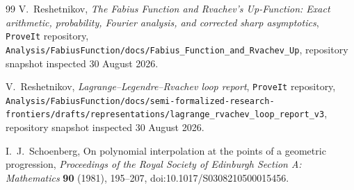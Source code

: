 \documentclass[11pt,a4paper,oneside]{article}
\theoremstyle{definition}
\theoremstyle{remark}
\begin{document}
\begin{thebibliography}{99}
V.~Reshetnikov,
\newblock \emph{The Fabius Function and Rvachev's Up-Function: Exact
arithmetic, probability, Fourier analysis, and corrected sharp asymptotics},
\newblock \texttt{ProveIt} repository,
\nolinkurl{Analysis/FabiusFunction/docs/Fabius_Function_and_Rvachev_Up},
repository snapshot inspected 30 August 2026.

V.~Reshetnikov,
\newblock \emph{Lagrange--Legendre--Rvachev loop report},
\newblock \texttt{ProveIt} repository,
\nolinkurl{Analysis/FabiusFunction/docs/semi-formalized-research-frontiers/drafts/representations/lagrange_rvachev_loop_report_v3},
repository snapshot inspected 30 August 2026.

I.~J.~Schoenberg,
\newblock On polynomial interpolation at the points of a geometric
progression,
\newblock \emph{Proceedings of the Royal Society of Edinburgh Section A:
Mathematics} \textbf{90} (1981), 195--207,
\newblock doi:10.1017/S0308210500015456.

\end{thebibliography}
\end{document}
